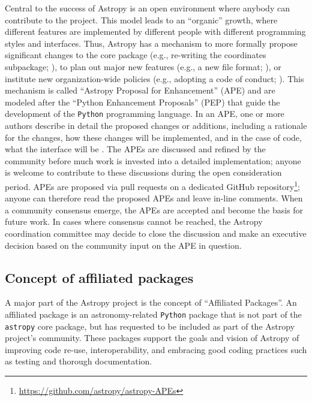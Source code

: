 \documentclass[modern]{aastex61}
\newcommand{\package}[1]{\texttt{#1}\xspace}
\newcommand{\python}{\package{Python}}
\newcommand{\astropy}{Astropy\xspace}
\newcommand{\astropypkg}{\package{astropy}}
\begin{document}
Central to the success of \astropy is an open environment where anybody can
contribute to the project.
This model leads to an ``organic'' growth, where different features are
implemented by different people with different programming styles and
interfaces.
Thus, \astropy has a mechanism to more formally propose significant changes to
the core package (e.g., re-writing the coordinates subpackage; \citealt{ape5}),
to plan out major new features (e.g., a new file format; \citealt{ape6}), or
institute new organization-wide policies (e.g., adopting a code of conduct;
\citealt{ape8}).
This mechanism is called ``Astropy Proposal for Enhancement'' (APE) and are
modeled after the ``Python Enhancement Proposals'' (PEP) that guide the
development of the \python programming language.
In an APE, one or more authors describe in detail the proposed changes or
additions, including a rationale for the changes, how these changes will be
implemented, and in the case of code, what the interface will be \citep{ape1}.
The APEs are discussed and refined by the community before much work is invested
into a detailed implementation; anyone is welcome to contribute to these
discussions during the open consideration period. APEs are proposed via pull
requests on a dedicated GitHub repository\footnote{\url{https://github.com/astropy/astropy-APEs}};
anyone can therefore read the proposed APEs and leave in-line comments.
When a community consensus emerge, the APEs are accepted and become
the basis for future work.
In cases where consensus cannot be reached, the
\astropy coordination committee may decide to close the discussion and
make an executive decision based on the community input on the APE in question.


\subsection{Concept of affiliated packages}

A major part of the \astropy project is the concept of
``Affiliated Packages''. An affiliated package is an astronomy-related
\python package that is not part of the \astropypkg core package, but
has requested to be included as part of the \astropy project's
community. These packages support the goals and vision of \astropy of
improving code re-use, interoperability, and embracing good coding
practices such as testing and thorough documentation.
\end{document}
